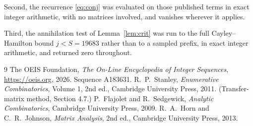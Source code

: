 \documentclass[11pt,a4paper]{article}
\theoremstyle{plain}
\theoremstyle{definition}
\begin{document}
Second, the recurrence \eqref{eq:conj} was evaluated on those published terms in exact
integer arithmetic, with no matrices involved, and vanishes wherever it applies.

Third, the annihilation test of Lemma~\ref{lem:crit} was run to the full Cayley--Hamilton
bound $j<S=19683$ rather than to a sampled prefix, in exact integer arithmetic, and returned
zero throughout.

\begin{thebibliography}{9}
 The OEIS Foundation, \emph{The On-Line Encyclopedia of Integer
Sequences}, \url{https://oeis.org}, 2026. Sequence A183631.
 R.~P.~Stanley, \emph{Enumerative Combinatorics}, Volume 1, 2nd ed.,
Cambridge University Press, 2011. (Transfer-matrix method, Section 4.7.)
 P.~Flajolet and R.~Sedgewick, \emph{Analytic Combinatorics}, Cambridge
University Press, 2009.
 R.~A.~Horn and C.~R.~Johnson, \emph{Matrix Analysis}, 2nd ed., Cambridge
University Press, 2013.
\end{thebibliography}
\end{document}

